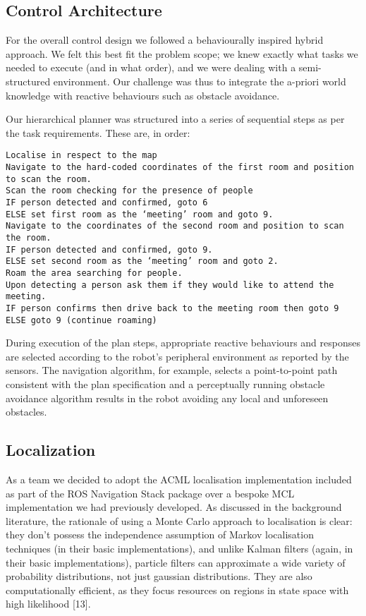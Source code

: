 \documentclass{article}
\begin{document}
	\subsection{Control Architecture}
	For the overall control design we followed a behaviourally inspired hybrid approach. We felt this best fit the problem scope; we knew exactly what tasks we needed to execute (and in what order), and we were dealing with a semi-structured environment. Our challenge was thus to integrate the a-priori world knowledge with reactive behaviours such as obstacle avoidance. 

Our hierarchical planner was structured into a series of sequential steps as per the task requirements. These are, in order:
\begin{lstlisting}
Localise in respect to the map
Navigate to the hard-coded coordinates of the first room and position to scan the room.
Scan the room checking for the presence of people
IF person detected and confirmed, goto 6
ELSE set first room as the ‘meeting’ room and goto 9.
Navigate to the coordinates of the second room and position to scan the room.
IF person detected and confirmed, goto 9.
ELSE set second room as the ‘meeting’ room and goto 2.
Roam the area searching for people.
Upon detecting a person ask them if they would like to attend the meeting.
IF person confirms then drive back to the meeting room then goto 9
ELSE goto 9 (continue roaming)
\end{lstlisting}

During execution of the plan steps, appropriate reactive behaviours and responses are selected according to the robot’s peripheral environment as reported by the sensors. The navigation algorithm, for example, selects a point-to-point path consistent with the plan specification and a perceptually running obstacle avoidance algorithm results in the robot avoiding any local and unforeseen obstacles.
	
	\subsection{Localization}
	As a team we decided to adopt the ACML localisation implementation included as part of the ROS Navigation Stack package over a bespoke MCL implementation we had previously developed. As discussed in the background literature, the rationale of using a Monte Carlo approach to localisation is clear: they don’t possess the independence assumption of Markov localisation techniques (in their basic implementations), and unlike Kalman filters (again, in their basic implementations), particle filters can approximate a wide variety of probability distributions, not just gaussian distributions. They are also computationally efficient, as they focus resources on regions in state space with high likelihood [13]. 
\end{document}
